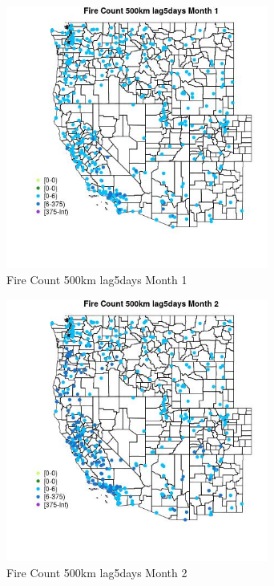 \begin{figure} 
\centering  
\includegraphics[width=0.77\textwidth]{Code_Outputs/Report_ML_input_PM25_Step4_part_e_de_duplicated_aves_compiled_2019-05-18wNAs_MapObsMo1Fire_Count_500km_lag5days.jpg} 
\caption{\label{fig:Report_ML_input_PM25_Step4_part_e_de_duplicated_aves_compiled_2019-05-18wNAsMapObsMo1Fire_Count_500km_lag5days}Fire Count 500km lag5days Month 1} 
\end{figure} 
 

\begin{figure} 
\centering  
\includegraphics[width=0.77\textwidth]{Code_Outputs/Report_ML_input_PM25_Step4_part_e_de_duplicated_aves_compiled_2019-05-18wNAs_MapObsMo2Fire_Count_500km_lag5days.jpg} 
\caption{\label{fig:Report_ML_input_PM25_Step4_part_e_de_duplicated_aves_compiled_2019-05-18wNAsMapObsMo2Fire_Count_500km_lag5days}Fire Count 500km lag5days Month 2} 
\end{figure} 
 

